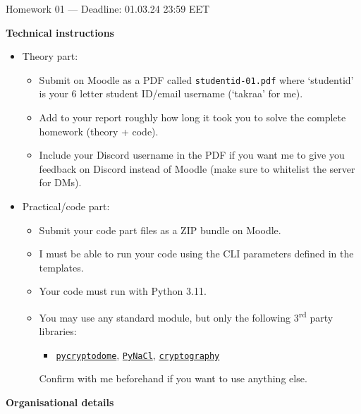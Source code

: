 \documentclass{practice}
\begin{document}
\begin{center}
Homework 01 --- Deadline: 01.03.24 23:59 EET
\end{center}

\textbf{Technical instructions}

\begin{itemize}
  \item Theory part:
  \begin{itemize}
    \item Submit on Moodle as a PDF called \texttt{studentid-01.pdf} where `studentid' is your 6 letter student ID/email username (`takraa' for me).
    \item Add to your report roughly how long it took you to solve the complete homework (theory + code).
    \item Include your Discord username in the PDF if you want me to give you feedback on Discord instead of Moodle (make sure to whitelist the server for DMs).
  \end{itemize}

  \item Practical/code part:
  \begin{itemize}
    \item Submit your code part files as a ZIP bundle on Moodle.
    \item I must be able to run your code using the CLI parameters defined in the templates.
    \item Your code must run with Python 3.11.
    \item You may use any standard module, but only the following 3\textsuperscript{rd} party libraries:
    \begin{itemize}
      \item \href{https://pypi.org/project/pycryptodome/}{\texttt{pycryptodome}}, \href{https://pypi.org/project/PyNaCl/}{\texttt{PyNaCl}}, \href{https://pypi.org/project/cryptography/}{\texttt{cryptography}}
    \end{itemize}

    Confirm with me beforehand if you want to use anything else.
  \end{itemize}
\end{itemize}

\textbf{Organisational details}
\end{document}
